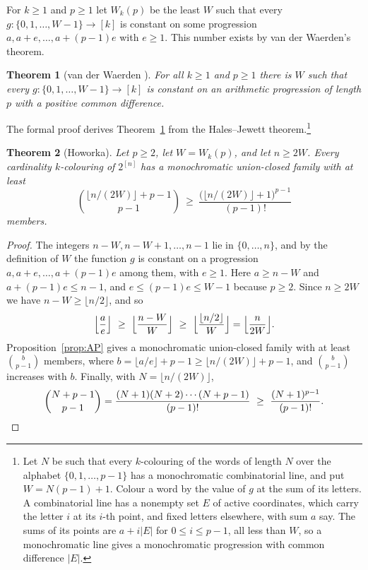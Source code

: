 \documentclass[11pt,reqno]{amsart}
\numberwithin{equation}{section}
\theoremstyle{plain}
\newtheorem{theorem}{Theorem}[section]
\theoremstyle{definition}
\theoremstyle{remark}
\begin{document}
For $k\ge1$ and $p\ge1$ let $W_k(p)$ be the least $W$ such that every
$g:\{0,1,\dots,W-1\}\to[k]$ is constant on some progression
$a,a+e,\dots,a+(p-1)e$ with $e\ge1$. This number exists by van der
Waerden's theorem.

\begin{theorem}[van der Waerden \cite{vdW27}]
\label{thm:vdw}
For all $k\ge1$ and $p\ge1$ there is $W$ such that every
$g:\{0,1,\dots,W-1\}\to[k]$ is constant on an arithmetic progression of
length $p$ with a positive common difference.
\end{theorem}

The formal proof derives Theorem~\ref{thm:vdw} from the Hales--Jewett
theorem.\footnote{Let $N$ be such that every $k$-colouring of the words
of length $N$ over the alphabet $\{0,1,\dots,p-1\}$ has a monochromatic
combinatorial line, and put $W=N(p-1)+1$. Colour a word by the value of
$g$ at the sum of its letters. A combinatorial line has a nonempty set
$E$ of active coordinates, which carry the letter $i$ at its $i$-th
point, and fixed letters elsewhere, with sum $a$ say. The sums of its
points are $a+i|E|$ for $0\le i\le p-1$, all less than $W$, so a
monochromatic line gives a monochromatic progression with common
difference $|E|$.}

\begin{theorem}[Howorka]
\label{thm:howorka}
Let $p\ge2$, let $W=W_k(p)$, and let $n\ge2W$. Every
cardinality $k$-colouring of $2^{[n]}$ has a monochromatic union-closed
family with at least
\[
\binom{\lfloor n/(2W)\rfloor+p-1}{p-1}\ \ge\
\frac{\bigl(\lfloor n/(2W)\rfloor+1\bigr)^{p-1}}{(p-1)!}
\]
members.
\end{theorem}

\begin{proof}
The integers $n-W,n-W+1,\dots,n-1$ lie in $\{0,\dots,n\}$, and by the
definition of $W$ the function $g$ is constant on a progression
$a,a+e,\dots,a+(p-1)e$ among them, with $e\ge1$. Here $a\ge n-W$ and
$a+(p-1)e\le n-1$, and $e\le(p-1)e\le W-1$ because $p\ge2$. Since $n\ge
2W$ we have $n-W\ge\lfloor n/2\rfloor$, and so
\[
\Bigl\lfloor\frac ae\Bigr\rfloor\ \ge\ \Bigl\lfloor\frac{n-W}{W}\Bigr\rfloor
\ \ge\ \Bigl\lfloor\frac{\lfloor n/2\rfloor}{W}\Bigr\rfloor
=\Bigl\lfloor\frac n{2W}\Bigr\rfloor .
\]
Proposition~\ref{prop:AP} gives a monochromatic union-closed family with
at least $\binom b{p-1}$ members, where $b=\lfloor a/e\rfloor+p-1\ge
\lfloor n/(2W)\rfloor+p-1$, and $\binom b{p-1}$ increases with $b$.
Finally, with $N=\lfloor n/(2W)\rfloor$,
\[
\binom{N+p-1}{p-1}=\frac{(N+1)(N+2)\cdots(N+p-1)}{(p-1)!}\ \ge\
\frac{(N+1)^{p-1}}{(p-1)!}. \qedhere
\]
\end{proof}
\end{document}
